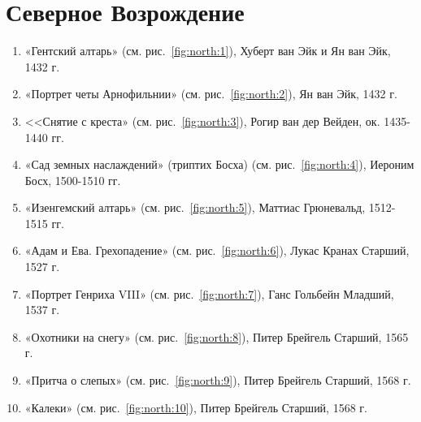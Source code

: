 \documentclass[a4paper,14pt]{article}
\begin{document}
\section*{Северное Возрождение}
\begin{enumerate}
\item «Гентский алтарь» (см. рис.~\ref{fig:north:1}), Хуберт ван Эйк и Ян ван Эйк, 1432 г.
\item «Портрет четы Арнофильнии» (см. рис.~\ref{fig:north:2}), Ян ван Эйк, 1432 г.
\item <<Снятие с креста» (см. рис.~\ref{fig:north:3}), Рогир ван дер Вейден, ок. 1435-1440 гг.
\item «Сад земных наслаждений» (триптих Босха) (см. рис.~\ref{fig:north:4}), Иероним Босх, 1500-1510 гг.
\item «Изенгемский алтарь» (см. рис.~\ref{fig:north:5}), Маттиас Грюневальд, 1512-1515 гг.
\item «Адам и Ева. Грехопадение» (см. рис.~\ref{fig:north:6}), Лукас Кранах Старший, 1527 г. 
\item «Портрет Генриха VIII» (см. рис.~\ref{fig:north:7}), Ганс Гольбейн Младший, 1537 г.
\item «Охотники на снегу» (см. рис.~\ref{fig:north:8}), Питер Брейгель Старший, 1565 г.
\item «Притча о слепых» (см. рис.~\ref{fig:north:9}), Питер Брейгель Старший, 1568 г.
\item «Калеки» (см. рис.~\ref{fig:north:10}), Питер Брейгель Старший, 1568 г.

\end{enumerate}

\clearpage

\clearpage

\end{document}
